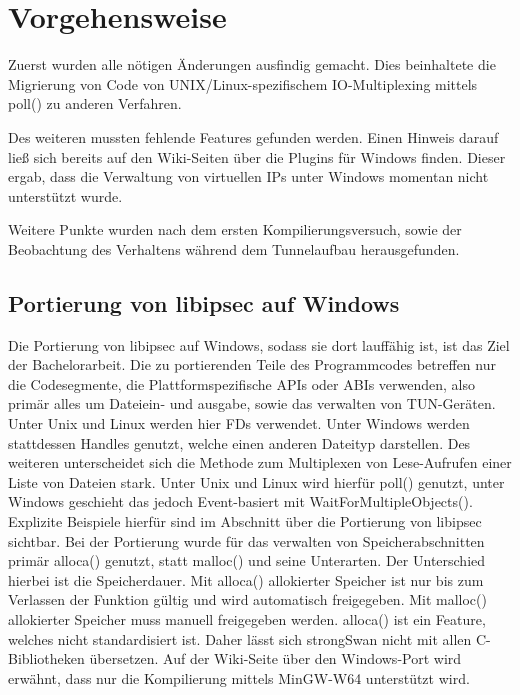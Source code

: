 



\section{Vorgehensweise}

Zuerst wurden alle nötigen Änderungen ausfindig gemacht. Dies beinhaltete
die Migrierung von Code von UNIX/Linux-spezifischem IO-Multiplexing
mittels poll() zu anderen Verfahren.

Des weiteren mussten fehlende Features gefunden werden. Einen Hinweis
darauf ließ sich bereits auf den Wiki-Seiten über die Plugins für Windows finden.
Dieser ergab, dass die Verwaltung von virtuellen IPs unter Windows momentan
nicht unterstützt wurde.

Weitere Punkte wurden nach dem ersten Kompilierungsversuch, sowie der Beobachtung
des Verhaltens während dem Tunnelaufbau herausgefunden.

\subsection{Portierung von libipsec auf Windows}
Die Portierung von libipsec auf Windows, sodass sie dort lauffähig ist, ist das Ziel
der Bachelorarbeit. Die zu portierenden Teile des Programmcodes betreffen nur
die Codesegmente, die Plattformspezifische \acp{API} oder \acp{ABI} verwenden,
also primär alles um Dateiein- und ausgabe, sowie das verwalten von TUN-Geräten.
Unter Unix und Linux werden hier \acp{FD} verwendet. Unter Windows werden stattdessen
Handles genutzt, welche einen anderen Dateityp darstellen. Des weiteren unterscheidet
sich die Methode zum Multiplexen von Lese-Aufrufen einer Liste von Dateien stark.
Unter Unix und Linux wird hierfür poll() genutzt, unter Windows geschieht das jedoch
Event-basiert mit WaitForMultipleObjects().
Explizite Beispiele hierfür sind im Abschnitt über die Portierung von libipsec sichtbar.
Bei der Portierung wurde für das verwalten von Speicherabschnitten 
primär alloca() genutzt, statt malloc() und seine Unterarten. Der Unterschied hierbei ist die
Speicherdauer. Mit alloca() allokierter Speicher ist nur bis zum Verlassen der Funktion gültig
und wird automatisch freigegeben. Mit malloc() allokierter Speicher muss manuell freigegeben werden.
alloca() ist ein Feature, welches nicht standardisiert ist.
Daher lässt sich strongSwan nicht mit allen C-Bibliotheken übersetzen.
Auf der Wiki-Seite über den Windows-Port wird erwähnt, dass nur die Kompilierung
mittels MinGW-W64 unterstützt wird.


